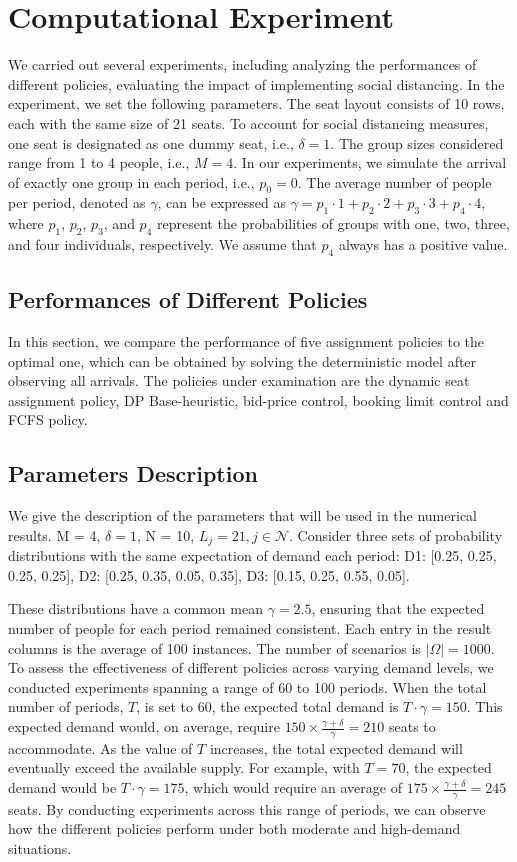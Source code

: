 \section{Computational Experiment}
We carried out several experiments, including analyzing the performances of different policies, evaluating the impact of implementing social distancing. In the experiment, we set the following parameters. The seat layout consists of 10 rows, each with the same size of 21 seats. To account for social distancing measures, one seat is designated as one dummy seat, i.e., $\delta =1$. The group sizes considered range from 1 to 4 people, i.e., $M =4$. In our experiments, we simulate the arrival of exactly one group in each period, i.e., $p_0 = 0$. The average number of people per period, denoted as $\gamma$, can be expressed as $\gamma = p_1 \cdot 1 + p_2 \cdot 2 + p_3 \cdot 3 + p_4 \cdot 4$, where $p_1$, $p_2$, $p_3$, and $p_4$ represent the probabilities of groups with one, two, three, and four individuals, respectively. We assume that $p_4$ always has a positive value.

\subsection{Performances of Different Policies}
In this section, we compare the performance of five assignment policies to the optimal one, which can be obtained by solving the deterministic model after observing all arrivals. The policies under examination are the dynamic seat assignment policy, DP Base-heuristic, bid-price control, booking limit control and FCFS policy. 

\subsection*{Parameters Description}
We give the description of the parameters that will be used in the numerical results. 
M = 4, $\delta = 1$, N = 10, $L_j = 21, j \in \mathcal{N}$. Consider three sets of probability distributions with the same expectation of demand each period:
D1: [0.25, 0.25, 0.25, 0.25], D2: [0.25, 0.35, 0.05, 0.35], D3: [0.15, 0.25, 0.55, 0.05].

These distributions have a common mean $\gamma = 2.5$, ensuring that the expected number of people for each period remained consistent. Each entry in the result columns is the average of 100 instances. The number of scenarios is $|\Omega| = 1000$. To assess the effectiveness of different policies across varying demand levels, we conducted experiments spanning a range of 60 to 100 periods. When the total number of periods, $T$, is set to 60, the expected total demand is $T \cdot \gamma = 150$. This expected demand would, on average, require $150 \times \frac{\gamma + \delta}{\gamma} = 210$ seats to accommodate. As the value of $T$ increases, the total expected demand will eventually exceed the available supply. For example, with $T = 70$, the expected demand would be $T \cdot \gamma = 175$, which would require an average of $175 \times \frac{\gamma + \delta}{\gamma} = 245$ seats. By conducting experiments across this range of periods, we can observe how the different policies perform under both moderate and high-demand situations. 


